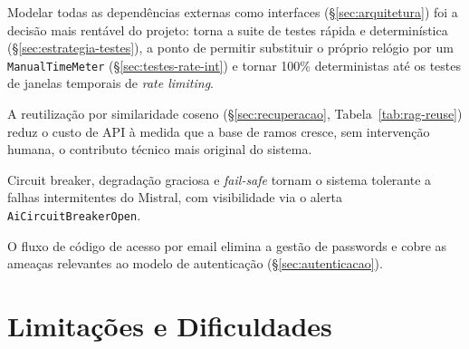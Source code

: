 \begin{description}[style=nextline, font=\bfseries]

\item[Arquitetura hexagonal]
Modelar todas as dependências externas como interfaces (§\ref{sec:arquitetura}) foi a decisão mais rentável do projeto: torna a suite de testes rápida e determinística (§\ref{sec:estrategia-testes}), a ponto de permitir substituir o próprio relógio por um \texttt{ManualTimeMeter} (§\ref{sec:testes-rate-int}) e tornar 100\% deterministas até os testes de janelas temporais de \textit{rate limiting}.

\item[Reutilização semântica de ramos]
A reutilização por similaridade coseno (§\ref{sec:recuperacao}, Tabela~\ref{tab:rag-reuse}) reduz o custo de API à medida que a base de ramos cresce, sem intervenção humana, o contributo técnico mais original do sistema.

\item[Resiliência do pipeline de IA]
Circuit breaker, degradação graciosa e \textit{fail-safe} tornam o sistema tolerante a falhas intermitentes do Mistral, com visibilidade via o alerta \texttt{AiCircuitBreakerOpen}.

\item[Autenticação sem senha]
O fluxo de código de acesso por email elimina a gestão de passwords e cobre as ameaças relevantes ao modelo de autenticação (§\ref{sec:autenticacao}).

\end{description}

\section{Limitações e Dificuldades} \label{sec:limitacoes}

